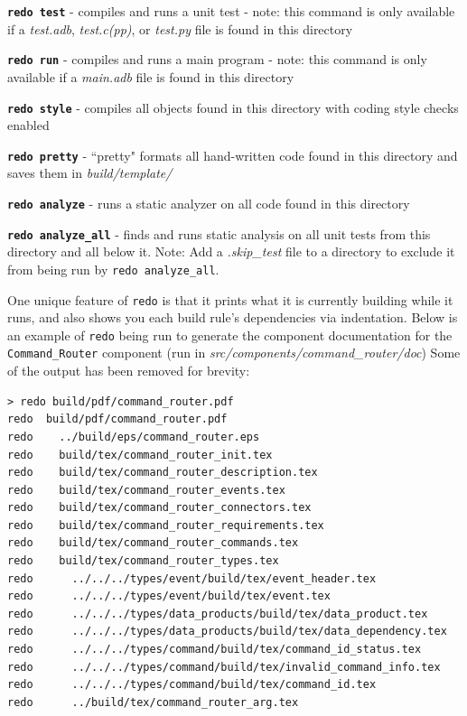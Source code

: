 \begin{spaceditemize}
  \item \textbf{\texttt{redo test}} - compiles and runs a unit test - note: this command is only available if a \textit{test.adb}, \textit{test.c(pp)}, or \textit{test.py} file is found in this directory
  \item \textbf{\texttt{redo run}} - compiles and runs a main program - note: this command is only available if a \textit{main.adb} file is found in this directory
  \item \textbf{\texttt{redo style}} - compiles all objects found in this directory with coding style checks enabled
  \item \textbf{\texttt{redo pretty}} - ``pretty" formats all hand-written code found in this directory and saves them in \textit{build/template/}
  \item \textbf{\texttt{redo analyze}} - runs a static analyzer on all code found in this directory
  \item \textbf{\texttt{redo analyze\_all}} - finds and runs static analysis on all unit tests from this directory and all below it. Note: Add a \textit{.skip\_test} file to a directory to exclude it from being run by \texttt{redo analyze\_all}.
\end{spaceditemize}
\vspace{5mm} %

One unique feature of \texttt{redo} is that it prints what it is currently building while it runs, and also shows you each build rule's dependencies via indentation. Below is an example of \texttt{redo} being run to generate the component documentation for the \texttt{Command\_Router} component (run in \textit{src/components/command\_router/doc}) Some of the output has been removed for brevity:

\vspace{5mm} %
\begin{verbatim}
> redo build/pdf/command_router.pdf
redo  build/pdf/command_router.pdf
redo    ../build/eps/command_router.eps
redo    build/tex/command_router_init.tex
redo    build/tex/command_router_description.tex
redo    build/tex/command_router_events.tex
redo    build/tex/command_router_connectors.tex
redo    build/tex/command_router_requirements.tex
redo    build/tex/command_router_commands.tex
redo    build/tex/command_router_types.tex
redo      ../../../types/event/build/tex/event_header.tex
redo      ../../../types/event/build/tex/event.tex
redo      ../../../types/data_products/build/tex/data_product.tex
redo      ../../../types/data_products/build/tex/data_dependency.tex
redo      ../../../types/command/build/tex/command_id_status.tex
redo      ../../../types/command/build/tex/invalid_command_info.tex
redo      ../../../types/command/build/tex/command_id.tex
redo      ../build/tex/command_router_arg.tex
\end{verbatim}
\vspace{5mm} %

